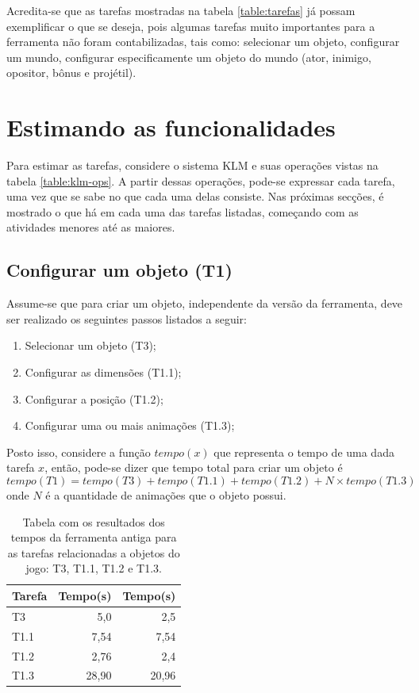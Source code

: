 \documentclass[12pt,oneside,openright,a4paper,english,brazil,sumario=tradicional]{abntex2}
\begin{document}
Acredita-se que as tarefas mostradas na tabela \ref{table:tarefas} já possam exemplificar o que se deseja, pois algumas tarefas muito importantes para a ferramenta não foram contabilizadas, tais como: selecionar um objeto, configurar um mundo, configurar especificamente um objeto do mundo (ator, inimigo, opositor, bônus e projétil).

\section{Estimando as funcionalidades}

Para estimar as tarefas, considere o sistema KLM e suas operações vistas na tabela \ref{table:klm-ops}.
A partir dessas operações, pode-se expressar cada tarefa, uma vez que se sabe no que cada uma delas consiste. Nas próximas secções, é mostrado o que há em cada uma das tarefas listadas, começando com as atividades menores até as maiores.

\subsection{Configurar um objeto (T1)}
\label{sec:t1}
Assume-se que para criar um objeto, independente da versão da ferramenta, deve ser realizado os seguintes passos listados a seguir:
\begin{enumerate}
   \item Selecionar um objeto (T3);
   \item Configurar as dimensões (T1.1);
   \item Configurar a posição (T1.2);
   \item Configurar uma ou mais animações (T1.3);
\end{enumerate}

Posto isso, considere a função $tempo(x)$ que representa o tempo de uma dada tarefa $x$, então, pode-se dizer que tempo total para criar um objeto é $$tempo(T1) = tempo(T3) + tempo(T1.1) + tempo(T1.2) + N \times tempo(T1.3)$$ onde $N$ é a quantidade de animações que o objeto possui.

\begin{table}[H]
   \centering
   \begin{tabular}{| l | r | r |}
      \hline
      \textbf{Tarefa} & \textbf{Tempo(s)} & \textbf{Tempo(s)} \\
      \hline
      T3 & 5,0 & 2,5 \\
      T1.1 & 7,54 & 7,54 \\
      T1.2 & 2,76 & 2,4 \\
      T1.3 & 28,90 & 20,96 \\
      \hline
   \end{tabular}
   \caption{Tabela com os resultados dos tempos da ferramenta antiga para as tarefas relacionadas a objetos do jogo: T3, T1.1, T1.2 e T1.3.}
   \label{table:obj_resultados_antiga}
\end{table}
\end{document}
